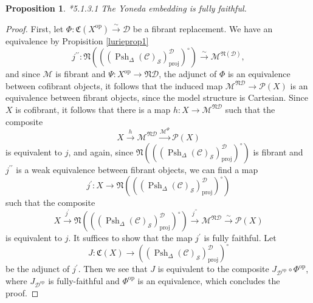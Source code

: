 \documentclass{amsart}
\numberwithin{equation}{section}
\theoremstyle{plain}   %
\newtheorem{prop}[subsection]{Proposition}
\theoremstyle{remark}
\theoremstyle{plain}
\DeclareMathOperator{\Psh}{Psh}
\newcommand{\op}{\ensuremath{\mathrm{op}}}
\newcommand{\C}{\ensuremath{\mathcal{C}}}
\newcommand{\M}{\ensuremath{\mathcal{M}}}
\newcommand{\Pre}{\ensuremath{\mathcal{P}}}
\newcommand{\setS}{\ensuremath{\mathscr{S}}}
\begin{document}
\begin{prop}\cite{htt}*{5.1.3.1}
	The Yoneda embedding is fully faithful.
\end{prop}
\begin{proof} 
	First, let \(\Phi:\mathfrak{C}(X^\op)\xrightarrow{\sim} \mathcal{D}\) be a fibrant replacement.  We have an equivalence by Propisition \ref{lurieprop1} 
	\[j^{\prime\prime}: \mathfrak{N}\left(\left((\Psh_\Delta(\C)_\setS)^\mathcal{D}_\mathrm{proj}\right)^\circ\right) \xrightarrow{\sim} \M^{\mathfrak{N}(\mathcal{D})}, \]
	and since \(\M\) is fibrant and \(\Psi:X^\op \to \mathfrak{N}\mathcal{D}\), the adjunct of \(\Phi\) is an equivalence between cofibrant objects, it follows that the induced map \(\M^{\mathfrak{N}\mathcal{D}}\to \Pre(X)\) is an equivalence between fibrant objects, since the model structure is Cartesian.  Since \(X\) is cofibrant, it follows that there is a map \(h:X\to \M^{\mathfrak{N}\mathcal{D}}\) such that the composite
	\[X \xrightarrow{h} \M^{\mathfrak{N}\mathcal{D}} \xrightarrow{\M^{\Psi}} \Pre(X)\]
	is equivalent to \(j\), and again, since \(\mathfrak{N}\left(\left((\Psh_\Delta(\C)_\setS)^\mathcal{D}_\mathrm{proj}\right)^\circ\right)\) is fibrant and \(j^{\prime\prime}\) is a weak equivalence between fibrant objects, we can find a map 
	\[j^\prime:X\to \mathfrak{N}\left(\left((\Psh_\Delta(\C)_\setS)^\mathcal{D}_\mathrm{proj}\right)^\circ\right)\]
	such that the composite 
	\[X\xrightarrow{j^\prime} \mathfrak{N}\left(\left((\Psh_\Delta(\C)_\setS)^\mathcal{D}_\mathrm{proj}\right)^\circ\right) \xrightarrow{j^{\prime\prime}} \M^{\mathfrak{N}\mathcal{D}} \xrightarrow{\sim} \Pre(X)\]
	is equivalent to \(j\).
	It suffices to show that the map \(j^\prime\) is fully faithful.  Let 
	\[J:\mathfrak{C}(X) \to \left((\Psh_\Delta(\C)_\setS)^\mathcal{D}_\mathrm{proj}\right)^\circ\]
	be the adjunct of \(j^\prime\).  Then we see that \(J\) is equivalent to the composite \(J_{\mathcal{D^\op}}\circ \Phi^\op\), where \(J_{\mathcal{D^\op}}\) is fully-faithful and \(\Phi^\op\) is an equivalence, which concludes the proof.	
\end{proof}
\end{document}
